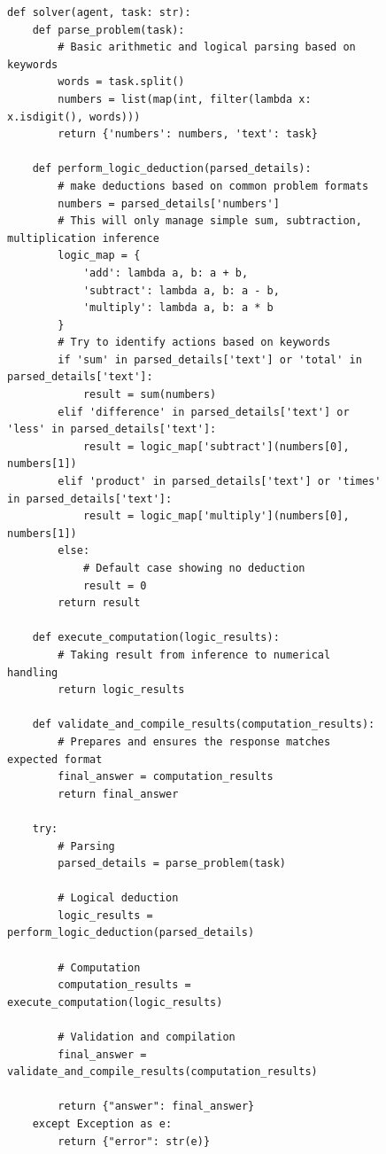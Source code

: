\newpage
\begin{figure}[ht]
\begin{lstlisting}[style=pythonstyle, caption={Policy at 6th Iteration found by \framework for MGSM.}]
def solver(agent, task: str):
    def parse_problem(task):
        # Basic arithmetic and logical parsing based on keywords
        words = task.split()
        numbers = list(map(int, filter(lambda x: x.isdigit(), words)))
        return {'numbers': numbers, 'text': task}

    def perform_logic_deduction(parsed_details):
        # make deductions based on common problem formats
        numbers = parsed_details['numbers']
        # This will only manage simple sum, subtraction, multiplication inference
        logic_map = {
            'add': lambda a, b: a + b,
            'subtract': lambda a, b: a - b,
            'multiply': lambda a, b: a * b
        }
        # Try to identify actions based on keywords
        if 'sum' in parsed_details['text'] or 'total' in parsed_details['text']:
            result = sum(numbers)
        elif 'difference' in parsed_details['text'] or 'less' in parsed_details['text']:
            result = logic_map['subtract'](numbers[0], numbers[1])
        elif 'product' in parsed_details['text'] or 'times' in parsed_details['text']:
            result = logic_map['multiply'](numbers[0], numbers[1])
        else:
            # Default case showing no deduction
            result = 0
        return result

    def execute_computation(logic_results):
        # Taking result from inference to numerical handling
        return logic_results

    def validate_and_compile_results(computation_results):
        # Prepares and ensures the response matches expected format
        final_answer = computation_results
        return final_answer

    try:
        # Parsing
        parsed_details = parse_problem(task)

        # Logical deduction
        logic_results = perform_logic_deduction(parsed_details)

        # Computation
        computation_results = execute_computation(logic_results)

        # Validation and compilation
        final_answer = validate_and_compile_results(computation_results)

        return {"answer": final_answer}
    except Exception as e:
        return {"error": str(e)}
\end{lstlisting}
\end{figure}

